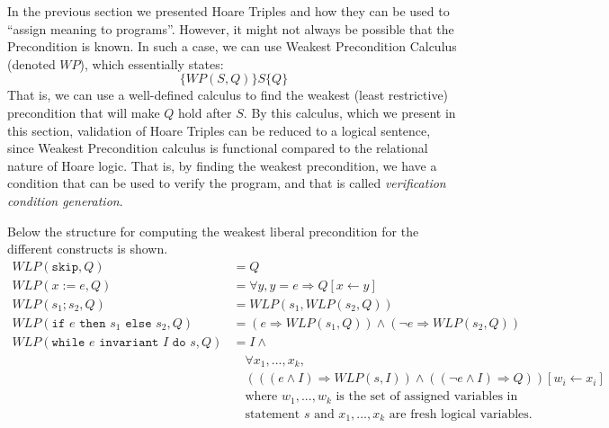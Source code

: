 

In the previous section we presented Hoare Triples and how they can be used to ``assign meaning to programs''. However, it might not always be possible that the Precondition is known. In such a case, we can use Weakest Precondition Calculus (denoted $WP$), which essentially states:
$$
 \{WP(S,Q)\}S\{Q\}
$$
That is, we can use a well-defined calculus to find the weakest (least restrictive) precondition that will make $Q$ hold after $S$. By this calculus, which we present in this section, validation of Hoare Triples can be reduced to a logical sentence, since Weakest Precondition calculus is functional compared to the relational nature of Hoare logic.
That is, by finding the weakest precondition, we have a condition that can be used to verify the program, and that is called \textit{verification condition generation}.

Below the structure for computing the weakest liberal precondition for the different constructs is shown.
\begin{align*}
	WLP(\texttt{skip}, Q) &= Q \\
	WLP(x:=e,Q) &= \forall y, y = e \Rightarrow Q[x \leftarrow y] \\
	WLP(s_1;s_2, Q) &= WLP(s_1, WLP(s_2, Q)) \\
	WLP(\texttt{if } e \texttt{ then } s_1 \texttt{ else } s_2, Q) &= (e \Rightarrow WLP(s_1, Q)) \land (\neg e \Rightarrow WLP(s_2, Q)) \\
	WLP(\texttt{while } e \texttt{ invariant } I \texttt{ do } s, Q) &= 
		I \land \\
    &\quad \forall x_1, ..., x_k, \\
    &\quad (((e \land I) \Rightarrow WLP(s, I)) \land (( \neg e \land I) \Rightarrow Q))
       [w_i \leftarrow x_i] \\
	&\quad \text{where } w_1, ..., w_k \text{ is the set of assigned variables in} \\
  &\quad \text{statement } s \text{ and } x_1, ..., x_k \text{ are fresh logical variables.}
\end{align*}

